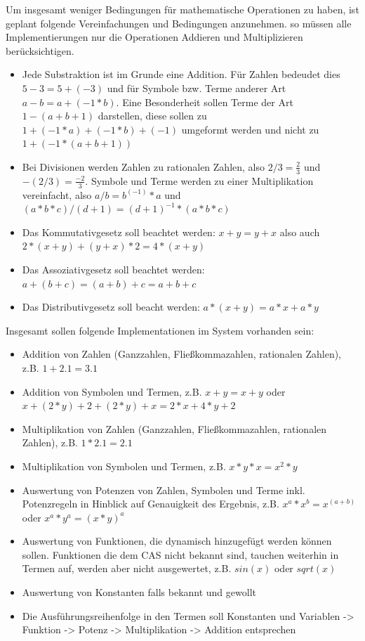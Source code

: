 \documentclass[11pt,a4paper, ngerman]{article}
\begin{document}
Um insgesamt weniger Bedingungen für mathematische Operationen zu haben, ist geplant folgende Vereinfachungen und Bedingungen anzunehmen. so müssen alle Implementierungen nur die Operationen Addieren und Multiplizieren berücksichtigen.
\begin{itemize}
    \item Jede Substraktion ist im Grunde eine Addition. Für Zahlen bedeudet dies $5-3 = 5+(-3)$ und für Symbole bzw. Terme anderer Art $a-b = a+(-1 * b)$. Eine Besonderheit sollen Terme der Art $1-(a+b+1)$ darstellen, diese sollen zu $1+(-1*a)+(-1*b)+(-1)$ umgeformt werden und nicht zu $1+(-1*(a+b+1))$
    \item Bei Divisionen werden Zahlen zu rationalen Zahlen, also $2/3 = \frac{2}{3}$ und $-(2/3) = \frac{-2}{3}$. Symbole und Terme werden zu einer Multiplikation vereinfacht, also $a/b = b^{(-1)} * a$ und $(a*b*c)/(d+1) = (d+1)^{-1} * (a*b*c)$
    \item Das Kommutativgesetz soll beachtet werden: $x+y = y+x$ also auch $2*(x+y) + (y+x)*2 = 4*(x+y)$
    \item Das Assoziativgesetz soll beachtet werden: $a+(b+c) = (a+b)+c = a+b+c$
    \item Das Distributivgesetz soll beacht werden: $a*(x+y) = a*x + a*y$
\end{itemize}

Insgesamt sollen folgende Implementationen im System vorhanden sein:
\begin{itemize}
    \item Addition von Zahlen (Ganzzahlen, Fließkommazahlen, rationalen Zahlen), z.B. $1+2.1 = 3.1$
    \item Addition von Symbolen und Termen, z.B. $x+y = x+y$ oder $x+(2*y)+2+(2*y)+x = 2*x+4*y+2$
    \item Multiplikation von Zahlen (Ganzzahlen, Fließkommazahlen, rationalen Zahlen), z.B. $1*2.1 = 2.1$
    \item Multiplikation von Symbolen und Termen, z.B. $x*y*x = x^2*y$
    \item Auswertung von Potenzen von Zahlen, Symbolen und Terme inkl. Potenzregeln in Hinblick auf Genauigkeit des Ergebnis, z.B. $x^a*x^b=x^{(a+b)}$ oder $x^a*y^a = (x*y)^a$
    \item Auswertung von Funktionen, die dynamisch hinzugefügt werden können sollen. Funktionen die dem CAS nicht bekannt sind, tauchen weiterhin in Termen auf, werden aber nicht ausgewertet, z.B. $sin(x)$ oder $sqrt(x)$
    \item Auswertung von Konstanten falls bekannt und gewollt
    \item Die Ausführungsreihenfolge in den Termen soll Konstanten und Variablen -> Funktion -> Potenz -> Multiplikation -> Addition entsprechen
\end{itemize}
\end{document}

